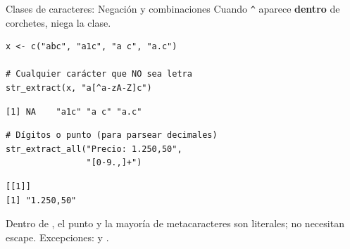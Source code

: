 \documentclass[8pt]{beamer}
\begin{document}
\begin{frame}[fragile]{Clases de caracteres: Negación y combinaciones}
	Cuando \verb|^| aparece \textbf{dentro} de corchetes, niega la clase.
\begin{lstlisting}[style=RScript]
x <- c("abc", "a1c", "a c", "a.c")

# Cualquier carácter que NO sea letra
str_extract(x, "a[^a-zA-Z]c")
\end{lstlisting}
\begin{lstlisting}[style=RConsole]
[1] NA    "a1c" "a c" "a.c"
\end{lstlisting}

\begin{lstlisting}[style=RScript]
# Dígitos o punto (para parsear decimales)
str_extract_all("Precio: 1.250,50",
                "[0-9.,]+")
\end{lstlisting}
\begin{lstlisting}[style=RConsole]
[[1]]
[1] "1.250,50"
\end{lstlisting}

	\begin{alertblock}{}
		Dentro de , el punto y la mayoría de metacaracteres son literales; no necesitan escape. Excepciones: \rscript{"]"} y .
	\end{alertblock}
\end{frame}
\end{document}
